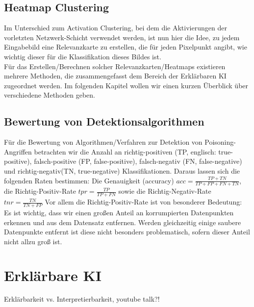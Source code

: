 \documentclass[11pt,a4paper]{article}
\numberwithin{equation}{section}
\begin{document}
	\subsection{Heatmap Clustering}
	Im Unterschied zum Activation Clustering, bei dem die Aktivierungen der vorletzten Netzwerk-Schicht verwendet werden, ist nun hier die Idee, zu jedem Eingabebild eine Relevanzkarte zu erstellen, die für jeden Pixelpunkt angibt, wie wichtig dieser für die Klassifikation dieses Bildes ist. \\
	
	Für das Erstellen/Berechnen solcher Relevanzkarten/Heatmaps existieren mehrere Methoden, die zusammengefasst dem Bereich der Erklärbaren KI zugeordnet werden.
	Im folgenden Kapitel wollen wir einen kurzen Überblick über verschiedene Methoden geben.
	
	
	\subsection{Bewertung von Detektionsalgorithmen}
	
	Für die Bewertung von Algorithmen/Verfahren zur Detektion von Poisoning-Angriffen betrachten wir die Anzahl an richtig-positiven  (TP, englisch: true-positive), falsch-positive (FP, false-positive), falsch-negativ (FN, false-negative) und richtig-negativ(TN, true-negative) Klassifikationen. Daraus lassen sich die folgenden Raten bestimmen:
	Die Genauigkeit (accuracy) $acc = \frac{TP+TN}{TP+FP+FN+TN}$, die Richtig-Positiv-Rate $tpr = \frac{TP}{TP+FN}$ sowie die Richtig-Negativ-Rate $tnr = \frac{TN}{TN+FP}$ Vor allem die Richtig-Positiv-Rate ist von besonderer Bedeutung: Es ist wichtig, dass wir einen großen Anteil an korrumpierten Datenpunkten erkennen und aus dem Datensatz entfernen. Werden gleichzeitig einige saubere Datenpunkte entfernt ist diese nicht besonders problematisch, sofern dieser Anteil nicht allzu groß ist.
	
	\section{Erklärbare KI} \label{chapter_xai}
	
	Erklärbarkeit vs. Interpretierbarkeit, youtube talk?!
	
\end{document}
